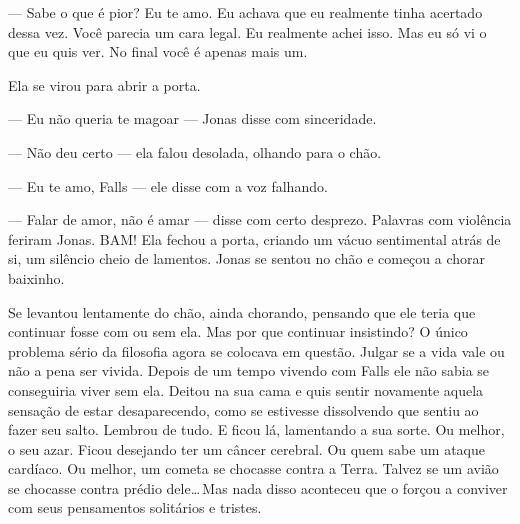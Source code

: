 --- Sabe o que é pior? Eu te amo. Eu achava que eu realmente tinha acertado dessa vez. Você parecia um cara legal. Eu realmente achei isso. Mas eu só vi o que eu quis ver. No final você é apenas mais um.

Ela se virou para abrir a porta.

--- Eu não queria te magoar ---  Jonas disse\mudanca{,} com sinceridade.

--- Não deu certo --- ela falou desolada, olhando para o chão.

--- Eu te amo, Falls --- ele disse\mudanca{,} com a voz falhando.

--- Falar de amor, não é amar --- disse com certo desprezo. Palavras com violência feriram Jonas. BAM! Ela fechou a porta, criando um vácuo sentimental atrás de si, um silêncio cheio de lamentos. Jonas se sentou no chão e começou a chorar baixinho.

Se levantou lentamente do chão, ainda chorando, pensando que ele teria que continuar fosse com ou sem ela. Mas por que continuar insistindo? O único problema sério da filosofia agora se colocava em questão. Julgar se a vida vale ou não a pena ser vivida. Depois de um tempo vivendo com Falls\mudanca{,} ele não sabia se conseguiria viver sem ela. Deitou na sua cama e quis sentir novamente aquela sensação de estar desaparecendo, como se estivesse dissolvendo\mudanca{,} que sentiu ao fazer seu salto. Lembrou de tudo. E ficou lá, lamentando a sua sorte. Ou melhor, o seu azar. Ficou desejando ter um câncer cerebral. Ou quem sabe um ataque cardíaco. Ou melhor, um cometa se chocasse contra a Terra. Talvez se um avião se chocasse contra  prédio dele\ldots\,Mas nada disso aconteceu que o forçou a conviver com seus pensamentos solitários e tristes.
